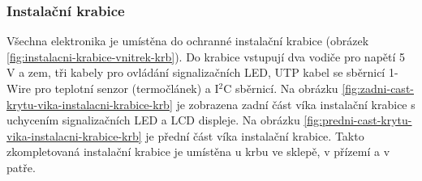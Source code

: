 \subsubsection{Instalační krabice}
Všechna elektronika je umístěna do ochranné instalační krabice (obrázek \ref{fig:instalacni-krabice-vnitrek-krb}). Do krabice vstupují dva vodiče pro napětí 5 V a zem, tři kabely pro ovládání signalizačních LED, UTP kabel se sběrnicí 1-Wire pro teplotní senzor (termočlánek) a I$^2$C sběrnicí. Na obrázku \ref{fig:zadni-cast-krytu-vika-instalacni-krabice-krb} je zobrazena zadní část víka instalační krabice s uchycením signalizačních LED a LCD displeje. Na obrázku \ref{fig:predni-cast-krytu-vika-instalacni-krabice-krb} je přední část víka instalační krabice. Takto zkompletovaná instalační krabice je umístěna u krbu ve sklepě, v přízemí a v patře.





